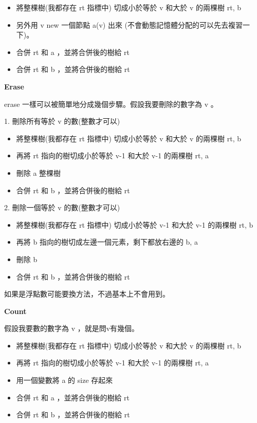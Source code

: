     \begin{itemize}
        \item 將整棵樹(我都存在 rt 指標中) 切成小於等於 v 和大於 v 的兩棵樹 rt, b
        \item 另外用 v new 一個節點 a(v) 出來 (不會動態記憶體分配的可以先去複習一下)。
        \item 合併 rt 和 a ，並將合併後的樹給 rt 
        \item 合併 rt 和 b ，並將合併後的樹給 rt
    \end{itemize}
    
    \textbf{Erase}

    erase 一樣可以被簡單地分成幾個步驟。假設我要刪除的數字為 v 。

    1. 刪除所有等於 v 的數(整數才可以) 

    \begin{itemize}
        \item 將整棵樹(我都存在 rt 指標中) 切成小於等於 v 和大於 v 的兩棵樹 rt, b
        \item 再將 rt 指向的樹切成小於等於 v-1 和大於 v-1 的兩棵樹 rt, a
        \item 刪除 a 整棵樹 
        \item 合併 rt 和 b ，並將合併後的樹給 rt
    \end{itemize}

    2. 刪除一個等於 v 的數(整數才可以) 

    \begin{itemize}
        \item 將整棵樹(我都存在 rt 指標中) 切成小於等於 v-1 和大於 v-1 的兩棵樹 rt, b
        \item 再將 b 指向的樹切成左邊一個元素，剩下都放右邊的 b, a 
        \item 刪除 b 
        \item 合併 rt 和 b ，並將合併後的樹給 rt
    \end{itemize}

    如果是浮點數可能要換方法，不過基本上不會用到。

    \textbf{Count}

    假設我要數的數字為 v ，就是問v有幾個。

    \begin{itemize}
        \item 將整棵樹(我都存在 rt 指標中) 切成小於等於 v 和大於 v 的兩棵樹 rt, b
        \item 再將 rt 指向的樹切成小於等於 v-1 和大於 v-1 的兩棵樹 rt, a
        \item 用一個變數將 a 的 size 存起來
        \item 合併 rt 和 a ，並將合併後的樹給 rt 
        \item 合併 rt 和 b ，並將合併後的樹給 rt
    \end{itemize}

